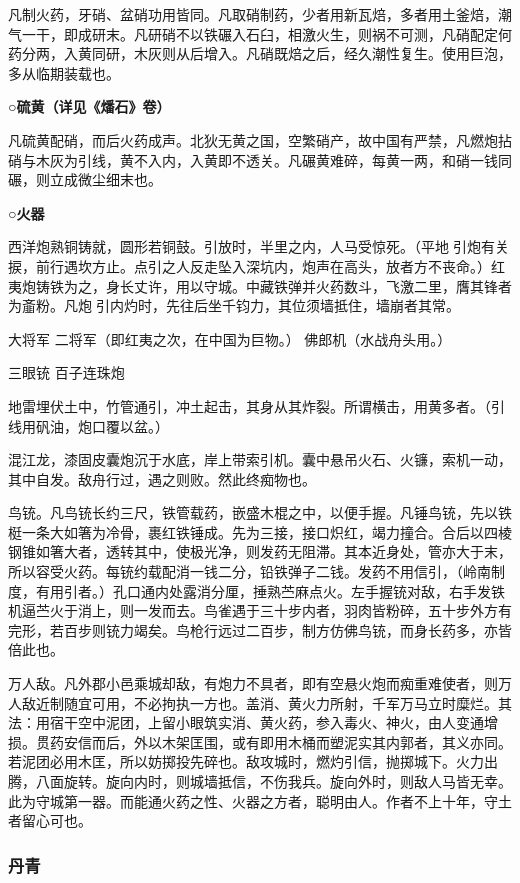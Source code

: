 \documentclass[]{article}
\begin{document}
凡制火药，牙硝、盆硝功用皆同。凡取硝制药，少者用新瓦焙，多者用土釜焙，潮气一干，即成研末。凡研硝不以铁碾入石臼，相激火生，则祸不可测，凡硝配定何药分两，入黄同研，木灰则从后增入。凡硝既焙之后，经久潮性复生。使用巨泡，多从临期装载也。

\textbf{○硫黄（详见《燔石》卷）}

凡硫黄配硝，而后火药成声。北狄无黄之国，空繁硝产，故中国有严禁，凡燃炮拈硝与木灰为引线，黄不入内，入黄即不透关。凡碾黄难碎，每黄一两，和硝一钱同碾，则立成微尘细末也。

\textbf{○火器}

西洋炮熟铜铸就，圆形若铜鼓。引放时，半里之内，人马受惊死。（平地引炮有关捩，前行遇坎方止。点引之人反走坠入深坑内，炮声在高头，放者方不丧命。）红夷炮铸铁为之，身长丈许，用以守城。中藏铁弹并火药数斗，飞激二里，膺其锋者为齑粉。凡炮引内灼时，先往后坐千钧力，其位须墙抵住，墙崩者其常。

大将军 二将军（即红夷之次，在中国为巨物。） 佛郎机（水战舟头用。）

三眼铳 百子连珠炮

地雷埋伏土中，竹管通引，冲土起击，其身从其炸裂。所谓横击，用黄多者。（引线用矾油，炮口覆以盆。）

混江龙，漆固皮囊炮沉于水底，岸上带索引机。囊中悬吊火石、火镰，索机一动，其中自发。敌舟行过，遇之则败。然此终痴物也。

鸟铳。凡鸟铳长约三尺，铁管载药，嵌盛木棍之中，以便手握。凡锤鸟铳，先以铁梃一条大如箸为冷骨，裹红铁锤成。先为三接，接口炽红，竭力撞合。合后以四棱钢锥如箸大者，透转其中，使极光净，则发药无阻滞。其本近身处，管亦大于末，所以容受火药。每铳约载配消一钱二分，铅铁弹子二钱。发药不用信引，（岭南制度，有用引者。）孔口通内处露消分厘，捶熟苎麻点火。左手握铳对敌，右手发铁机逼苎火于消上，则一发而去。鸟雀遇于三十步内者，羽肉皆粉碎，五十步外方有完形，若百步则铳力竭矣。鸟枪行远过二百步，制方仿佛鸟铳，而身长药多，亦皆倍此也。

万人敌。凡外郡小邑乘城却敌，有炮力不具者，即有空悬火炮而痴重难使者，则万人敌近制随宜可用，不必拘执一方也。盖消、黄火力所射，千军万马立时糜烂。其法：用宿干空中泥团，上留小眼筑实消、黄火药，参入毒火、神火，由人变通增损。贯药安信而后，外以木架匡围，或有即用木桶而塑泥实其内郭者，其义亦同。若泥团必用木匡，所以妨掷投先碎也。敌攻城时，燃灼引信，抛掷城下。火力出腾，八面旋转。旋向内时，则城墙抵信，不伤我兵。旋向外时，则敌人马皆无幸。此为守城第一器。而能通火药之性、火器之方者，聪明由人。作者不上十年，守土者留心可也。

\hypertarget{header-n2745}{%
\subsubsection{丹青}\label{header-n2745}}
\end{document}
